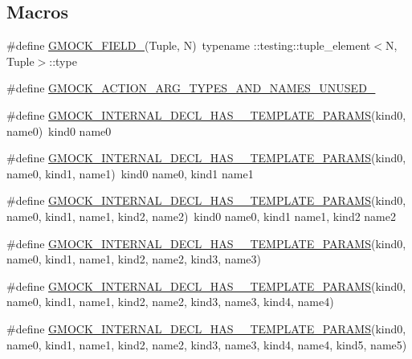 \subsection*{Macros}
\begin{DoxyCompactItemize}
\item 
\#define \hyperlink{gmock-generated-actions_8h_a6eb3ce92b0613603057a20ec9e593317}{G\+M\+O\+C\+K\+\_\+\+F\+I\+E\+L\+D\+\_\+}(Tuple,  N)~typename \+::testing\+::tuple\+\_\+element$<$N, Tuple$>$\+::type
\item 
\#define \hyperlink{gmock-generated-actions_8h_a069f37fdbe36aabe65da6eb6221b9b19}{G\+M\+O\+C\+K\+\_\+\+A\+C\+T\+I\+O\+N\+\_\+\+A\+R\+G\+\_\+\+T\+Y\+P\+E\+S\+\_\+\+A\+N\+D\+\_\+\+N\+A\+M\+E\+S\+\_\+\+U\+N\+U\+S\+E\+D\+\_\+}
\item 
\#define \hyperlink{gmock-generated-actions_8h_a8b8b1a43495f82aefe40c410bc1ce392}{G\+M\+O\+C\+K\+\_\+\+I\+N\+T\+E\+R\+N\+A\+L\+\_\+\+D\+E\+C\+L\+\_\+\+H\+A\+S\+\_\+\_\+\+T\+E\+M\+P\+L\+A\+T\+E\+\_\+\+P\+A\+R\+A\+MS}(kind0,  name0)~kind0 name0
\item 
\#define \hyperlink{gmock-generated-actions_8h_aa238172d277a7ba189a5d481356a6c66}{G\+M\+O\+C\+K\+\_\+\+I\+N\+T\+E\+R\+N\+A\+L\+\_\+\+D\+E\+C\+L\+\_\+\+H\+A\+S\+\_\+\_\+\+T\+E\+M\+P\+L\+A\+T\+E\+\_\+\+P\+A\+R\+A\+MS}(kind0,  name0,  kind1,  name1)~kind0 name0, kind1 name1
\item 
\#define \hyperlink{gmock-generated-actions_8h_ae776d1f23c7b8defac49269c69e64baa}{G\+M\+O\+C\+K\+\_\+\+I\+N\+T\+E\+R\+N\+A\+L\+\_\+\+D\+E\+C\+L\+\_\+\+H\+A\+S\+\_\+\_\+\+T\+E\+M\+P\+L\+A\+T\+E\+\_\+\+P\+A\+R\+A\+MS}(kind0,  name0,  kind1,  name1,  kind2,  name2)~kind0 name0, kind1 name1, kind2 name2
\item 
\#define \hyperlink{gmock-generated-actions_8h_a19b48575600b1a046c3f77d5dfc124ba}{G\+M\+O\+C\+K\+\_\+\+I\+N\+T\+E\+R\+N\+A\+L\+\_\+\+D\+E\+C\+L\+\_\+\+H\+A\+S\+\_\+\_\+\+T\+E\+M\+P\+L\+A\+T\+E\+\_\+\+P\+A\+R\+A\+MS}(kind0,  name0,  kind1,  name1,  kind2,  name2,  kind3,  name3)
\item 
\#define \hyperlink{gmock-generated-actions_8h_aef0f11711d63f65561ce5a4d032673f8}{G\+M\+O\+C\+K\+\_\+\+I\+N\+T\+E\+R\+N\+A\+L\+\_\+\+D\+E\+C\+L\+\_\+\+H\+A\+S\+\_\+\_\+\+T\+E\+M\+P\+L\+A\+T\+E\+\_\+\+P\+A\+R\+A\+MS}(kind0,  name0,  kind1,  name1,  kind2,  name2,  kind3,  name3,  kind4,  name4)
\item 
\#define \hyperlink{gmock-generated-actions_8h_a4c90362350df0faa6e866642f44708fe}{G\+M\+O\+C\+K\+\_\+\+I\+N\+T\+E\+R\+N\+A\+L\+\_\+\+D\+E\+C\+L\+\_\+\+H\+A\+S\+\_\+\_\+\+T\+E\+M\+P\+L\+A\+T\+E\+\_\+\+P\+A\+R\+A\+MS}(kind0,  name0,  kind1,  name1,  kind2,  name2,  kind3,  name3,  kind4,  name4,  kind5,  name5)

\end{DoxyCompactItemize}
